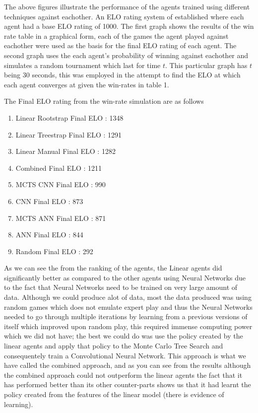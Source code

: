 \documentclass[a4paper,12pt,table]{article}
\begin{document}
The above figures illustrate the performance of the agents trained using different techniques against eachother. An ELO rating system of established where each agent had a base ELO rating of 1000. The first graph shows the results of the win rate table in a graphical form, each of the games the agent played against eachother were used as the basis for the final ELO rating of each agent. The second graph uses the each agent's probability of winning against eachother and simulates a random tournament which last for time $t$. This particular graph has $t$ being $30$ seconds, this was employed in the attempt to find the ELO at which each agent converges at given the win-rates in table 1. \par

The Final ELO rating from the win-rate simulation are as follows

\begin{enumerate}
    \item Linear Rootstrap Final ELO : 1348
    \item Linear Treestrap Final ELO : 1291
    \item Linear Manual Final ELO : 1282
    \item Combined Final ELO : 1211
    \item MCTS CNN Final ELO : 990
    \item CNN Final ELO : 873
    \item MCTS ANN Final ELO : 871
    \item ANN Final ELO : 844
    \item Random Final ELO : 292
\end{enumerate}

As we can see the from the ranking of the agents, the Linear agents did significantly better as compared to the other agents using Neural Networks due to the fact that Neural Networks need to be trained on very large amount of data. Although we could produce alot of data, most the data produced was using random games which does not emulate expert play and thus the Neural Networks needed to go through multiple iterations by learning from a previous versions of itself which improved upon random play, this required immense computing power which we did not have; the best we could do was use the policy created by the linear agents and apply that policy to the Monte Carlo Tree Search and consequentely train a Convolutional Neural Network. This approach is what we have called the combined approach, and as you can see from the results although the combined approach could not outperform the linear agents the fact that it has performed better than its other counter-parts shows us that it had learnt the policy created from the features of the linear model (there is evidence of learning). \par
\end{document}

